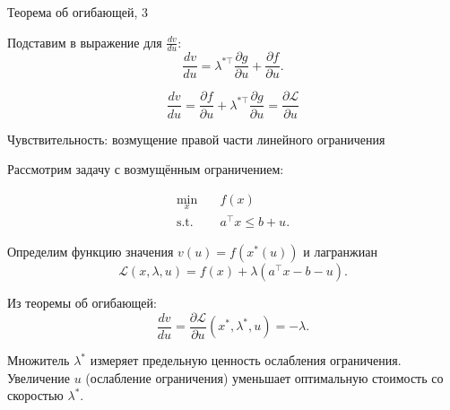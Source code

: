 \documentclass{beamer}
\begin{document}
\begin{frame}{Теорема об огибающей, 3}
	\begin{flushleft}
		
		Подставим в выражение для $\frac{dv}{du}$:
		\begin{equation}
			\frac{dv}{du}
			=
			\lambda^{*\top} \frac{\partial g}{\partial u}
			+
			\frac{\partial f}{\partial u}.
		\end{equation}
		
		
		\begin{equation}
			\boxed{
				\frac{dv}{du}
				=
				\frac{\partial f}{\partial u}
				+
				\lambda^{*\top} \frac{\partial g}{\partial u}
				=
				\frac{\partial \mathcal{L}}{\partial u}
			}
		\end{equation}
		
	\end{flushleft}
\end{frame}

\begin{frame}{Чувствительность: возмущение правой части линейного ограничения}
	\begin{flushleft}
		
		Рассмотрим задачу с возмущённым ограничением:
		
		\begin{equation*}
			\begin{aligned}
				\min_x \quad & f(x) \\
				\text{s.t.} \quad & a^\top x \le b + u.
			\end{aligned}
		\end{equation*}
		
		Определим функцию значения $v(u) = f(x^*(u))$ и лагранжиан
		\begin{equation*}
			\mathcal{L}(x,\lambda,u) = f(x) + \lambda (a^\top x - b - u).
		\end{equation*}
		
		Из теоремы об огибающей:
		\begin{equation*}
			\frac{dv}{du} = \frac{\partial \mathcal{L}}{\partial u}(x^*, \lambda^*, u) = -\lambda.
		\end{equation*}
		
		Множитель $\lambda^*$ измеряет предельную ценность ослабления ограничения. Увеличение $u$ (ослабление ограничения) уменьшает оптимальную стоимость со скоростью $\lambda^*$.
		
	\end{flushleft}
\end{frame}
\end{document}

